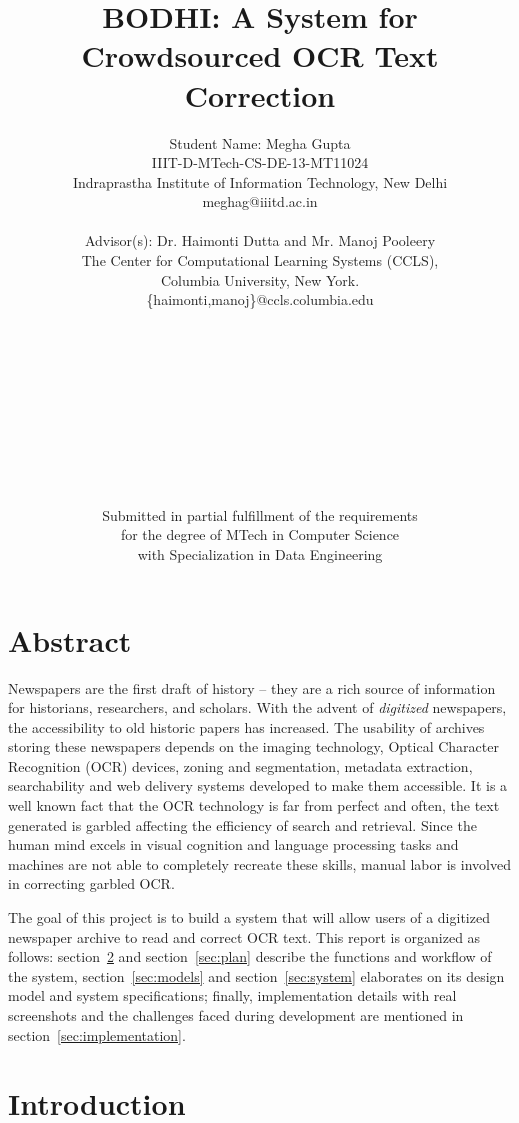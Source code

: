 \documentclass[12pt]{article}
\title{BODHI: A System for Crowdsourced OCR Text Correction}
\author{Student Name: Megha Gupta\\
IIIT-D-MTech-CS-DE-13-MT11024\\
Indraprastha Institute of Information Technology,
New Delhi\\
meghag@iiitd.ac.in
\\ \\
Advisor(s): Dr. Haimonti Dutta and Mr. Manoj Pooleery \\
The Center for Computational Learning Systems (CCLS),\\
Columbia University, New York.\\
\{haimonti,manoj\}@ccls.columbia.edu \\
\\ \\ \\ \\ \\ \\ \\ \\ \\ \\  
Submitted in partial fulfillment of the requirements\\
for the degree of MTech in Computer Science\\
with Specialization in Data Engineering\\}
\begin{document}
\maketitle
\newpage
\section{Abstract}
\label{sec:abstract}
Newspapers are the first draft of history -- they are a rich source of information for historians, researchers, and scholars. With the advent of \emph{digitized} newspapers, the accessibility to old historic papers has increased. The usability of archives storing these newspapers depends on the imaging technology, Optical Character Recognition (OCR) devices, zoning and segmentation, metadata extraction, searchability and web delivery systems developed to make them accessible. It is a well known fact that the OCR technology is far from perfect and often, the text generated is garbled affecting the efficiency of search and retrieval. 
Since the human mind excels in visual cognition and language processing tasks and machines are not able to completely recreate these skills, manual labor is involved in correcting garbled OCR. 

The goal of this project is to build a system that will allow users of a digitized newspaper archive to read and correct OCR text. This report is organized as follows: section~\ref{sec:intro} and section~\ref{sec:plan} describe the functions and workflow of the system, section~\ref{sec:models} and section~\ref{sec:system} elaborates on its design model and system specifications; finally, implementation details with real screenshots and the challenges faced during development are mentioned in section~\ref{sec:implementation}.

%

\newpage
\tableofcontents

\newpage
\section{Introduction}
\label{sec:intro}
\end{document}
